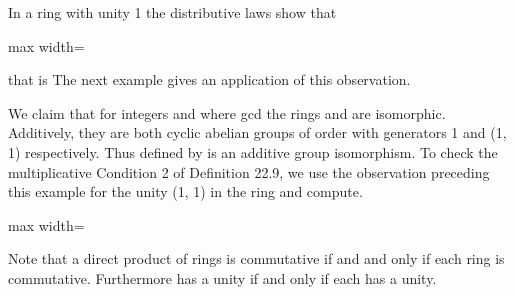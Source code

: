 \documentclass[11pt,oneside]{article}
\begin{document}
\BookNarrativetrue

\begin{BookBody}

\noindent In a ring with unity 1 the distributive laws show that

\begin{center}\begin{adjustbox}{max width=\linewidth}\end{adjustbox}\end{center}

\noindent that is The next example gives an application of this observation.

 We claim that for integers  and  where gcd the rings  and  are isomorphic. Additively, they are both cyclic abelian groups of order  with generators 1 and (1, 1) respectively. Thus  defined by  is an additive group isomorphism. To check the multiplicative Condition 2 of Definition 22.9, we use the observation preceding this example for the unity (1, 1) in the ring  and compute.

\begin{center}\begin{adjustbox}{max width=\linewidth}\end{adjustbox}\end{center} \BookEnd{\blacktriangle}

Note that a direct product  of rings is commutative if and and only if each ring  is commutative. Furthermore has a unity if and only if each  has a unity.


\end{BookBody}
\end{document}
